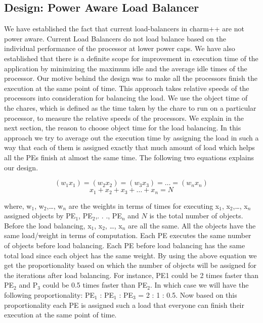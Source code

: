 \subsection{Design: Power Aware Load Balancer}
We have established the fact that current load-balancers in charm++ are not
power aware. Current Load Balancers do not load balance based on the individual
performance of the processor at lower power caps. We have also established that
there is a definite scope for improvement in execution time of the application
by minimizing the maximum idle and the average idle times of the processor.
Our motive behind the design was to make all the processors finish the
execution at the same point of time. This approach takes relative speeds of the
processors into consideration for balancing the load. We use the object time of
the chares, which is defined as the time taken by the chare to run on a
particular processor, to measure the relative speeds of the processors. We
explain in the next section, the reason to choose object time for the load
balancing.  In this approach we try to average out the execution time by
assigning the load in such a way that each of them is assigned exactly that
much amount of load which helps all the PEs finish at almost the same time. 
The following two equations explains our design.  


    \begin{equation} \label{eq:3}
      (w_1x_1) = (w_2x_2) = (w_3x_3) = \dots = (w_nx_n) 
    \end{equation}
    \begin{equation} \label{eq:4}
      x_1 + x_2 + x_3 + \dots + x_n = N
    \end{equation}

  where, w$_1$, w$_2$,\dots , w$_n$ are the weights in terms of times for executing
  x$_1$, x$_2$,\dots , x$_n$ assigned objects by PE$_1$, PE$_2$,. . ., PE$_n$ 
  and $N$ is the total number of objects. 
  Before the load balancing, x$_1$, x$_2$, \dots,  x$_n$ are all the same. All the objects have
  the same load/weight in terms of computation.  Each PE executes the same
  number of objects before load balancing. Each PE before load balancing has
  the same total load since each object has the same weight. By using the above
  equation we get the proportionality based on which the number of objects will
  be assigned for the iterations after load balancing. For instance, PE1 could
  be 2 times faster than PE$_2$ and P$_3$ could be 0.5 times faster than PE$_2$. In
  which case we will have the following proportionality: PE$_1$ : PE$_1$ : PE$_3$ = 2 :
  1 : 0.5. Now based on this proportionality each PE is assigned such a load
  that everyone can finish their execution at the same point of time.  
  
